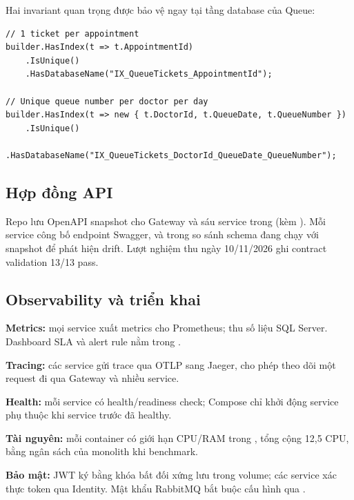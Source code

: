 Hai invariant quan trọng được bảo vệ ngay tại tầng database của Queue:

\begin{lstlisting}[language={[Sharp]C}]
// 1 ticket per appointment
builder.HasIndex(t => t.AppointmentId)
    .IsUnique()
    .HasDatabaseName("IX_QueueTickets_AppointmentId");

// Unique queue number per doctor per day
builder.HasIndex(t => new { t.DoctorId, t.QueueDate, t.QueueNumber })
    .IsUnique()
    .HasDatabaseName("IX_QueueTickets_DoctorId_QueueDate_QueueNumber");
\end{lstlisting}

\subsection{Hợp đồng API}

Repo lưu OpenAPI snapshot cho Gateway và sáu service trong  (kèm ). Mỗi service công bố endpoint Swagger, và  trong  so sánh schema đang chạy với snapshot để phát hiện drift. Lượt nghiệm thu ngày 10/11/2026 ghi contract validation 13/13 pass.

\subsection{Observability và triển khai}

\begin{codeitems}
  \item \textbf{Metrics:} mọi service xuất metrics cho Prometheus;  thu số liệu SQL Server. Dashboard SLA và alert rule nằm trong .
  \item \textbf{Tracing:} các service gửi trace qua OTLP sang Jaeger, cho phép theo dõi một request đi qua Gateway và nhiều service.
  \item \textbf{Health:} mỗi service có health/readiness check; Compose chỉ khởi động service phụ thuộc khi service trước đã healthy.
  \item \textbf{Tài nguyên:} mỗi container có giới hạn CPU/RAM trong , tổng cộng 12,5 CPU, bằng ngân sách của monolith khi benchmark.
  \item \textbf{Bảo mật:} JWT ký bằng khóa bất đối xứng lưu trong volume; các service xác thực token qua Identity. Mật khẩu RabbitMQ bắt buộc cấu hình qua .
\end{codeitems}
